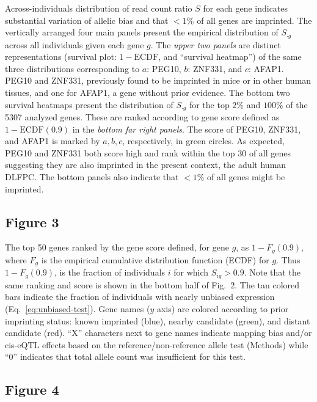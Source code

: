 \documentclass[letterpaper]{article}
\begin{document}
Across-individuals distribution of read count ratio \(S\) for each
gene indicates substantial variation of allelic bias and that \(<1\%\) of all
genes are imprinted.  The vertically arranged
four main panels present the empirical distribution of \(S_{\cdot g}\) across all
individuals given each gene \(g\).  The \emph{upper two panels} are distinct
representations (survival plot: \(1 - \mathrm{ECDF}\), and
``survival heatmap'') of the same three distributions corresponding to \(a\):
PEG10, \(b\): ZNF331, and \(c\): AFAP1.  PEG10 and ZNF331,
previously found to be imprinted in mice or in other human tissues, and one
for AFAP1, a gene without prior evidence.  The bottom two survival heatmaps present
the distribution of \(S_{\cdot g}\) for the top \(2\%\) and \(100\%\) of the
5307 analyzed genes.  These are ranked according to gene score defined as \(1
- \mathrm{ECDF}(0.9)\) in the \emph{bottom
far right panels}.  The score of PEG10, ZNF331, and AFAP1 is marked by
\(a,b,c\), respectively, in green circles.  As expected, PEG10 and ZNF331 both score
high and rank within the top 30 of all genes suggesting they are also imprinted in
the present context, the adult human DLFPC.  The bottom panels also indicate
that \(<1\%\) of all genes might be imprinted.

\subsection*{Figure 3}

The top 50 genes ranked by the gene score defined, for gene \(g\), as \(1 -
F_g(0.9)\), where \(F_g\) is the empirical cumulative distribution function
(ECDF) for \(g\).  Thus \(1 - F_g(0.9)\), is the fraction of individuals \(i\)
for which \(S_{ig}>0.9\).  Note that the same ranking and score is shown in
the bottom half of Fig.~2.  The tan colored bars
indicate the fraction of individuals with nearly unbiased expression
(Eq.~\ref{eq:unbiased-test}).  Gene names (\(y\) axis) are colored according
to prior imprinting status: known imprinted (blue), nearby candidate (green),
and distant candidate (red).  ``X'' characters next to gene names indicate
mapping bias and/or cis-eQTL effects based on the reference/non-reference
allele test (Methods) while ``0'' indicates that total allele count was
insufficient for this test.

\subsection*{Figure 4}
\end{document}
